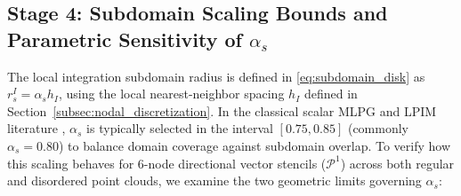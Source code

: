 \documentclass[VANCOUVER,Times1COL]{WileyNJD-v5}
\begin{document}
\subsection{Stage 4: Subdomain Scaling Bounds and Parametric Sensitivity of $\alpha_s$}
\label{subsec:stage4_alpha_s}

The local integration subdomain radius is defined in \eqref{eq:subdomain_disk} as $r_s^I = \alpha_s h_I$, using the local nearest-neighbor spacing $h_I$ defined in Section~\ref{subsec:nodal_discretization}. In the classical scalar MLPG and LPIM literature \cite{atluri2002meshless, liu2009mesh}, $\alpha_s$ is typically selected in the interval $[0.75, 0.85]$ (commonly $\alpha_s = 0.80$) to balance domain coverage against subdomain overlap. To verify how this scaling behaves for 6-node directional vector stencils ($\mathcal{P}^1$) across both regular and disordered point clouds, we examine the two geometric limits governing $\alpha_s$:
\end{document}
